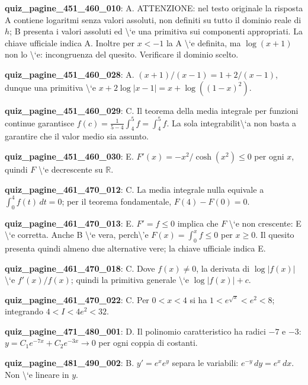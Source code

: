 \documentclass[11pt,a4paper]{article}
\newcounter{quiz}
\begin{document}
\noindent\textbf{quiz\_pagine\_451\_460\_010}: A. ATTENZIONE: nel testo originale la risposta A contiene logaritmi senza valori assoluti, non definiti su tutto il dominio reale di $h$; B presenta i valori assoluti ed \textbackslash{}`e una primitiva sui componenti appropriati. La chiave ufficiale indica A. Inoltre per $x<-1$ la A \textbackslash{}`e definita, ma $\log(x+1)$ non lo \textbackslash{}`e: incongruenza del quesito. Verificare il dominio scelto.\par\medskip
\noindent\textbf{quiz\_pagine\_451\_460\_028}: A. $(x+1)/(x-1)=1+2/(x-1)$, dunque una primitiva \textbackslash{}`e $x+2\log|x-1|=x+\log((1-x)^2)$.\par\medskip
\noindent\textbf{quiz\_pagine\_451\_460\_029}: C. Il teorema della media integrale per funzioni continue garantisce $f(c)=\frac1{5-4}\int_4^5 f=\int_4^5 f$. La sola integrabilit\textbackslash{}`a non basta a garantire che il valor medio sia assunto.\par\medskip
\noindent\textbf{quiz\_pagine\_451\_460\_030}: E. $F\prime(x)=-x^2/\cosh(x^2)\le0$ per ogni $x$, quindi $F$ \textbackslash{}`e decrescente su $\mathbb R$.\par\medskip
\noindent\textbf{quiz\_pagine\_461\_470\_012}: C. La media integrale nulla equivale a $\int_0^4 f(t)\,dt=0$; per il teorema fondamentale, $F(4)-F(0)=0$.\par\medskip
\noindent\textbf{quiz\_pagine\_461\_470\_013}: E. $F\prime=f\le0$ implica che $F$ \textbackslash{}`e non crescente: E \textbackslash{}`e corretta. Anche B \textbackslash{}`e vera, perch\textbackslash{}'e $F(x)=\int_0^x f\le0$ per $x\ge0$. Il quesito presenta quindi almeno due alternative vere; la chiave ufficiale indica E.\par\medskip
\noindent\textbf{quiz\_pagine\_461\_470\_018}: C. Dove $f(x)\neq0$, la derivata di $\log|f(x)|$ \textbackslash{}`e $f\prime(x)/f(x)$; quindi la primitiva generale \textbackslash{}`e $\log|f(x)|+c$.\par\medskip
\noindent\textbf{quiz\_pagine\_461\_470\_022}: C. Per $0<x<4$ si ha $1<e^{\sqrt{x}}<e^2<8$; integrando $4<I<4e^2<32$.\par\medskip
\noindent\textbf{quiz\_pagine\_471\_480\_001}: D. Il polinomio caratteristico ha radici $-7$ e $-3$: $y=C_1e^{-7x}+C_2e^{-3x}\to0$ per ogni coppia di costanti.\par\medskip
\noindent\textbf{quiz\_pagine\_481\_490\_002}: B. $y\prime=e^x e^y$ separa le variabili: $e^{-y}\,dy=e^x\,dx$. Non \textbackslash{}`e lineare in $y$.\par\medskip
\end{document}
